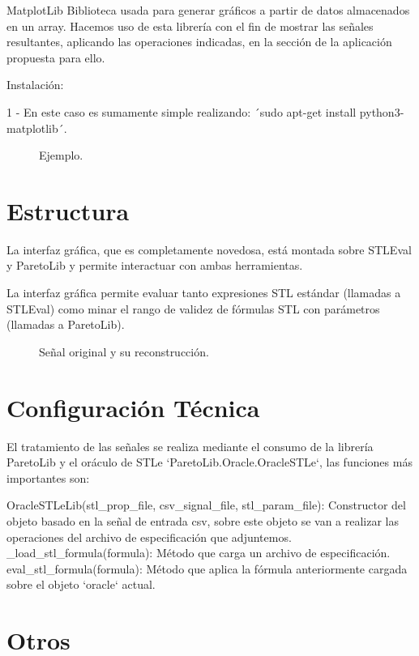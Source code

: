 MatplotLib
Biblioteca usada para generar gráficos a partir de datos almacenados en un array. Hacemos uso de esta librería con el fin de mostrar las señales resultantes, aplicando las operaciones indicadas, en la sección de la aplicación propuesta para ello. 
 
Instalación: 
 
1 - En este caso es sumamente simple realizando: ´sudo apt-get install python3-matplotlib´.
 
\begin{figure}
\centering
\caption{Ejemplo.}
\label{fig:senal}
\end{figure}
 
 
\section{Estructura}
\label{sec:estructura}
La interfaz gráfica, que es completamente novedosa, está montada sobre STLEval y ParetoLib y permite interactuar con ambas herramientas.

La interfaz gráfica permite evaluar tanto expresiones STL estándar (llamadas a STLEval) como minar el rango de validez de fórmulas STL con parámetros (llamadas a ParetoLib).

\begin{figure}
\centering
\caption{Señal original y su reconstrucción.}
\label{fig:senal}
\end{figure} 
 
\section{Configuración Técnica}
El tratamiento de las señales se realiza mediante el consumo de la librería ParetoLib y el oráculo de STLe `ParetoLib.Oracle.OracleSTLe`, las funciones más importantes son: 
 
OracleSTLeLib(stl\_prop\_file, csv\_signal\_file, stl\_param\_file): Constructor del objeto basado en la señal de entrada csv, sobre este objeto se van a realizar las operaciones del archivo de especificación que adjuntemos. 
\_load\_stl\_formula(formula): Método que carga un archivo de especificación. 
eval\_stl\_formula(formula): Método que aplica la fórmula anteriormente cargada sobre el objeto `oracle` actual.
 
 
 
 
 
\section{Otros}

